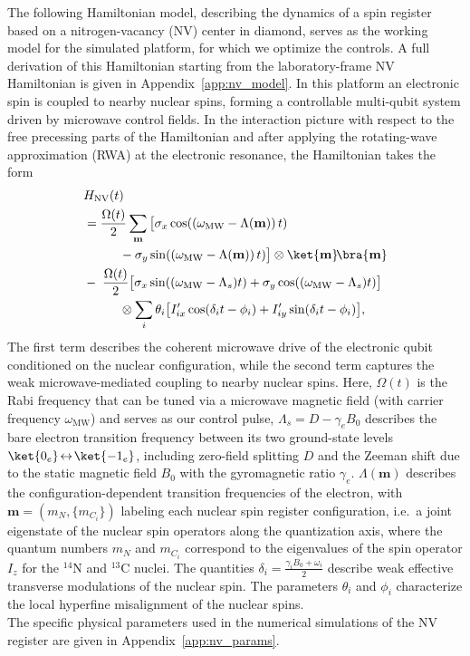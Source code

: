 The following Hamiltonian model, describing the dynamics of a spin register based on a nitrogen-vacancy (NV) center in diamond, serves as the working model for the simulated platform, for which we optimize the controls. A full derivation of this Hamiltonian starting from the laboratory-frame NV Hamiltonian is given in Appendix~\ref{app:nv_model}. In this platform an electronic spin is coupled to nearby nuclear spins, forming a controllable multi-qubit system driven by microwave control fields. In the interaction picture with respect to the free precessing parts of the  Hamiltonian and after applying the rotating-wave approximation (RWA) at the electronic resonance, the Hamiltonian takes the form
\begin{equation}
\begin{aligned}
&\notag H_{\mathrm{NV}}(t)\\
&=\frac{\Omega(t)}{2}\sum_{\mathbf m}
\big[\sigma_x\cos((\omega_{\mathrm{MW}}-\Lambda(\mathbf m))\,t)\\
&\hspace{1.0cm}-\sigma_y\sin((\omega_{\mathrm{MW}}-\Lambda(\mathbf m))\,t)\big] \otimes \ket{\mathbf m}\!\bra{\mathbf m} \\
&-\;\frac{\Omega(t)}{2}\big[\sigma_x\sin((\omega_{\mathrm{MW}}-\Lambda_s) t)+\sigma_y\cos((\omega_{\mathrm{MW}}-\Lambda_s) t)\big] \\
&\hspace{1.0cm}\otimes\sum_i \theta_i \big[I'_{ix}\cos(\delta_i t-\phi_i)+I'_{iy}\sin(\delta_i t-\phi_i)\big],
\end{aligned}
\label{eq:H_NV_RWA_main}
\end{equation}
The first term describes the coherent microwave drive of the electronic qubit conditioned on the nuclear configuration, while the second term captures the weak microwave-mediated coupling to nearby nuclear spins.  
Here, $\Omega(t)$ is the Rabi frequency that can be tuned via a microwave magnetic field (with carrier frequency $\omega_{\mathrm{MW}}$) and serves as our control pulse, $\Lambda_s= D - \gamma_e B_0$ describes the bare electron transition frequency between its two ground-state levels \(\ket{0_e}\!\leftrightarrow\!\ket{-1_e}\), including zero-field splitting $D$ and the Zeeman shift due to the static magnetic field $B_0$ with the gyromagnetic ratio $\gamma_e$. $\Lambda(\mathbf{m})$ describes the configuration-dependent transition frequencies of the electron, with  $\mathbf m=(m_N,\{m_{C_i}\})$ labeling each nuclear spin register configuration, i.e.\ a joint eigenstate of the nuclear spin operators along the quantization axis, where the quantum numbers $m_N$ and $m_{C_i}$ correspond to the eigenvalues of the spin operator $I_z$ for the $^{14}$N and $^{13}$C nuclei. 
The quantities $\delta_i= \frac{\gamma_i B_0 + \omega_i}{2}$ describe weak effective transverse modulations of the nuclear spin. The parameters $\theta_i$ and $\phi_i$ characterize the local hyperfine misalignment of the nuclear spins.\\
The specific physical parameters used in the numerical simulations of the NV register are given in Appendix~\ref{app:nv_params}.


